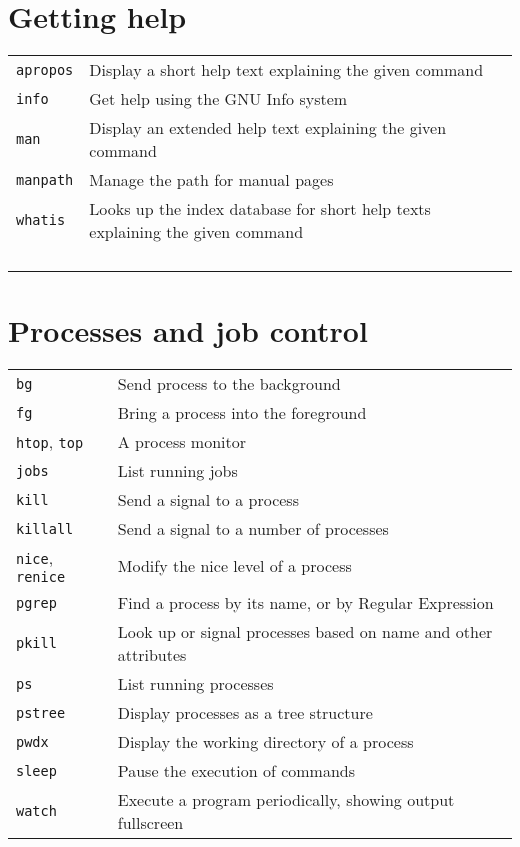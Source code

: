 \documentclass[10pt]{article}
\begin{document}
\begin{multicols}{2}   

\section{Getting help}
\begin{tabular}{ p{2.5cm} p{8.5cm} }
  \hline
  \texttt{apropos} & Display a short help text explaining the given command \\
  \rowcolor{Gray}
  \texttt{info} & Get help using the GNU Info system \\
  \texttt{man} & Display an extended help text explaining the given command \\
  \rowcolor{Gray}
  \texttt{manpath} & Manage the path for manual pages \\
  \texttt{whatis} & Looks up the index database for short help texts explaining the given command\\
  \hline
  & \\
  & \\
  & \\
  & \\
\end{tabular}

\section{Processes and job control}
\begin{tabular}{ p{2.5cm} p{8.5cm} }
  \hline
  \texttt{bg} & Send process to the background \\
  \rowcolor{Gray}
  \texttt{fg} & Bring a process into the foreground \\
  \texttt{htop}, \texttt{top} & A process monitor \\
  \rowcolor{Gray}
  \texttt{jobs} & List running jobs \\
  \texttt{kill} & Send a signal to a process \\
  \rowcolor{Gray}
  \texttt{killall} & Send a signal to a number of processes\\
  \texttt{nice}, \texttt{renice} & Modify the nice level of a process \\
  \rowcolor{Gray}
  \texttt{pgrep} & Find a process by its name, or by Regular Expression \\
  \texttt{pkill} & Look up or signal processes based on name and other attributes\\
  \rowcolor{Gray}
  \texttt{ps} & List running processes \\
  \texttt{pstree} & Display processes as a tree structure \\
  \rowcolor{Gray}
  \texttt{pwdx} & Display the working directory of a process\\
  \texttt{sleep} & Pause the execution of commands \\
  \rowcolor{Gray}
  \texttt{watch} & Execute a program periodically, showing output fullscreen \\
  \hline
\end{tabular}


\end{multicols}
\end{document}
